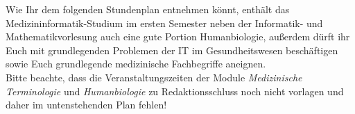 Wie Ihr dem folgenden Stundenplan entnehmen könnt, enthält das Medizininformatik-Studium im ersten Semester neben der Informatik- und Mathematikvorlesung auch eine gute Portion Humanbiologie, außerdem dürft ihr Euch mit grundlegenden Problemen der IT im Gesundheitswesen beschäftigen sowie Euch grundlegende medizinische Fachbegriffe aneignen.\\
Bitte beachte, dass die Veranstaltungszeiten der Module \textit{Medizinische Terminologie} und \textit{Humanbiologie} zu Redaktionsschluss noch nicht vorlagen und daher im untenstehenden Plan fehlen! \\
\noindent{}

